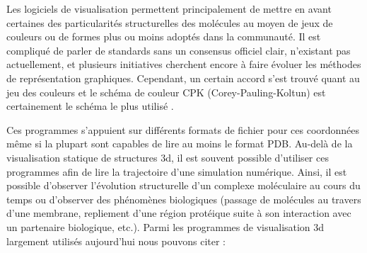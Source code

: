 Les logiciels de visualisation permettent principalement de mettre en avant certaines des particularités structurelles des molécules au moyen de jeux de couleurs ou de formes plus ou moins adoptés dans la communauté. Il est compliqué de parler de standards sans un consensus officiel clair, n'existant pas actuellement, et plusieurs initiatives cherchent encore à faire évoluer les méthodes de représentation graphiques. Cependant, un certain accord s'est trouvé quant au jeu des couleurs et le schéma de couleur CPK (Corey-Pauling-Koltun) est certainement le schéma le plus utilisé \cite{corey1953molecular}.

Ces programmes s'appuient sur différents formats de fichier pour ces coordonnées même si la plupart sont capables de lire au moins le format PDB. Au-delà de la visualisation statique de structures 3d, il est souvent possible d'utiliser ces programmes afin de lire la trajectoire d'une simulation numérique. Ainsi, il est possible d'observer l'évolution structurelle d'un complexe moléculaire au cours du temps ou d'observer des phénomènes biologiques (passage de molécules au travers d'une membrane, repliement d'une région protéique suite à son interaction avec un partenaire biologique, etc.). Parmi les programmes de visualisation 3d largement utilisés aujourd'hui nous pouvons citer : 
